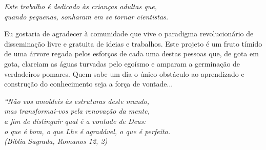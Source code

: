 \documentclass[
  	11pt,%
 	openright,%
 	twoside,%
 	a4paper,%
 	english,%
 	brazil %
 	]{abntex2}
\begin{document}
\frenchspacing 

\imprimircapa

\imprimirfolhaderosto*

% 

%
% 
%

\begin{dedicatoria}
   \vspace*{\fill}
   \centering
   \noindent
   \textit{ Este trabalho é dedicado às crianças adultas que,\\
   quando pequenas, sonharam em se tornar cientistas.} \vspace*{\fill}
\end{dedicatoria}

\begin{agradecimentos}
Eu gostaria de agradecer à comunidade que vive o paradigma revolucionário de disseminação livre e gratuita de ideias e trabalhos.
Este projeto é um fruto tímido de uma árvore regada pelos esforços de cada uma destas pessoas que, de gota em gota, clareiam as águas 
turvadas pelo egoísmo e amparam a germinação de verdadeiros pomares.
Quem sabe um dia o único obstáculo ao aprendizado e construção do conhecimento seja a força de vontade...
\end{agradecimentos}

\begin{epigrafe}
    \vspace*{\fill}
	\begin{flushright}
		\textit{``Não vos amoldeis às estruturas deste mundo, \\
		mas transformai-vos pela renovação da mente, \\
		a fim de distinguir qual é a vontade de Deus: \\
		o que é bom, o que Lhe é agradável, o que é perfeito.\\
		(Bíblia Sagrada, Romanos 12, 2)}
	\end{flushright}
\end{epigrafe}
\end{document}
